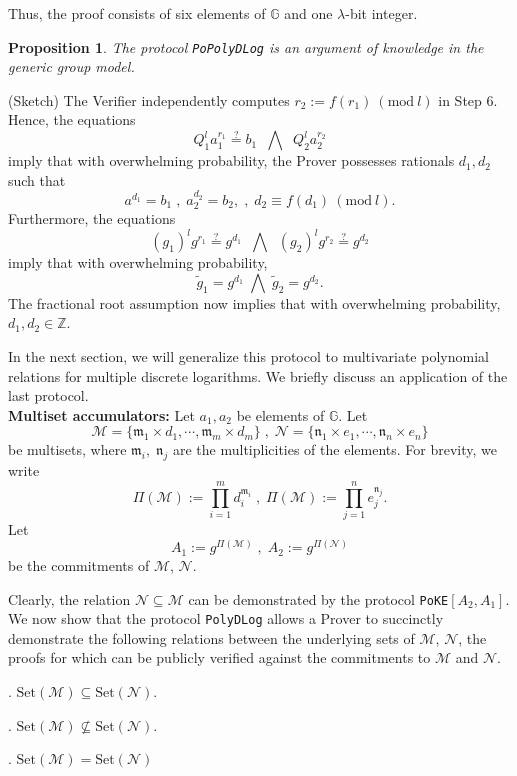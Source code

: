 \documentclass[11pt, lettersize, notitlepage, leqno, footskip=0.6cm]{article}
\newcommand{\bz}{\mathbb Z}
\newcommand{\pl}{\prod\limits}
\newcommand{\sett}{\mr{Set}}
\newcommand{\wti}{\widetilde}
\newcommand{\mf}{\mathfrak}
\newcommand{\mc}{\mathcal}
\newcommand{\mb}{\mathbb}
\newcommand{\mr}{\mathrm}
\newcommand{\mfm}{\mathfrak{m}}
\newcommand{\mfn}{\mathfrak{n}}
\newcommand{\lam}{\lambda}
\newcommand{\sub}{\subseteq}
\newcommand{\nsub}{\nsubseteq}
\newcommand{\vs}{\vspace{-0.15cm}}
\newcommand{\noin}{\noindent}
\newcommand{\op}{overwhelming probability}
\newcommand{\Mod}[1]{\ (\mathrm{mod}\ #1)}
\newtheorem{Prop}[Thm]{Proposition}
\numberwithin{equation}{section}
\begin{document}
\noindent Thus, the proof consists of six elements of $\mb{G}$ and one $\lam$-bit integer.

\begin{Prop} The protocol \verb|PoPolyDLog| is an argument of knowledge in the generic group
model.\end{Prop}

\begin{prf} (Sketch) The Verifier independently computes $r_2:= f(r_1)\Mod{l}$ in Step 6. Hence, the equations $$Q_1^{l}a_1^{r_1}\stackrel{?}{=} b_1\;\;\bigwedge\;\; Q_2^{l}a_2^{r_2}$$ imply that with \op, the Prover possesses rationals $d_1,d_2$ such that $$a^{d_1} = b_1\;,\;a_2^{d_2} = b_2,\;,\;d_2\equiv f(d_1)\Mod{l}.$$ Furthermore, the equations \vs $$(g_1)^lg^{r_1} \stackrel{?}{=} g^{d_1}\;\;\bigwedge\;\; (g_2)^lg^{r_2} \stackrel{?}{=} g^{d_2} $$ imply that with \op, \vs $$\wti{g}_1 = g^{d_1}\;\bigwedge\;\wti{g}_2 = g^{d_2}. $$ The fractional root assumption now implies that with \op, $d_1,d_2\in \bz$.\end{prf}

\noin In the next section, we will generalize this protocol to multivariate polynomial relations for multiple discrete logarithms. We briefly discuss an application of the last protocol.\\

\noin \textbf{Multiset accumulators:} Let $a_1,a_2$ be elements of $\mb{G}$. Let \vs $$\mc{M} = \{\mf{m}_1\times d_1,\cdots, \mf{m}_m\times d_m \}\;,\;\mc{N} = \{\mf{n}_1\times e_1,\cdots, \mf{n}_n\times e_n \}$$ be multisets, where $\mf{m}_i,\;\mf{n}_j$ are the multiplicities of the elements. For brevity, we write \vs $$\Pi(\mc{M}):= \pl_{i=1}^m d_i^{\mfm_i}\;,\; \Pi(\mc{M}):= \pl_{j=1}^n e_j^{\mfn_j}.$$ Let \vs $$A_1:= g^{\Pi(\mc{M})}\;,\; A_2:= g^{\Pi(\mc{N})}$$ be the commitments of $\mc{M}$, $\mc{N}$.

Clearly, the relation $\mc{N}\sub \mc{M}$ can be demonstrated by the protocol \verb|PoKE|$[A_2, A_1]$. We now show that the protocol \verb|PolyDLog| allows a Prover to succinctly demonstrate the following relations between the underlying sets of $\mc{M}$, $\mc{N}$, the proofs for which can be publicly verified against the commitments to $\mc{M}$ and $\mc{N}$.\vspace{0.1cm}

\noin 1. $\sett(\mc{M})\sub \sett(\mc{N})$.

\noin 2. $\sett(\mc{M})\nsub \sett(\mc{N})$.

\noin 3. $\sett(\mc{M}) = \sett(\mc{N})$ \vspace{0.1cm}
\end{document}
